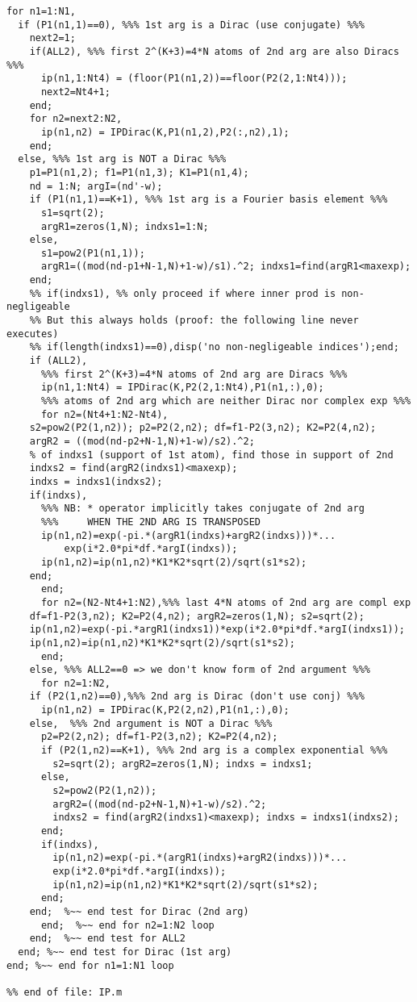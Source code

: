 \begin{verbatim}
for n1=1:N1,
  if (P1(n1,1)==0), %%% 1st arg is a Dirac (use conjugate) %%%
    next2=1;
    if(ALL2), %%% first 2^(K+3)=4*N atoms of 2nd arg are also Diracs %%%
      ip(n1,1:Nt4) = (floor(P1(n1,2))==floor(P2(2,1:Nt4)));
      next2=Nt4+1;
    end;
    for n2=next2:N2,
      ip(n1,n2) = IPDirac(K,P1(n1,2),P2(:,n2),1);
    end;
  else, %%% 1st arg is NOT a Dirac %%%
    p1=P1(n1,2); f1=P1(n1,3); K1=P1(n1,4);
    nd = 1:N; argI=(nd'-w);
    if (P1(n1,1)==K+1), %%% 1st arg is a Fourier basis element %%%
      s1=sqrt(2); 
      argR1=zeros(1,N); indxs1=1:N;
    else,
      s1=pow2(P1(n1,1)); 
      argR1=((mod(nd-p1+N-1,N)+1-w)/s1).^2; indxs1=find(argR1<maxexp);
    end;
    %% if(indxs1), %% only proceed if where inner prod is non-negligeable
    %% But this always holds (proof: the following line never executes)
    %% if(length(indxs1)==0),disp('no non-negligeable indices');end;
    if (ALL2), 
      %%% first 2^(K+3)=4*N atoms of 2nd arg are Diracs %%%
      ip(n1,1:Nt4) = IPDirac(K,P2(2,1:Nt4),P1(n1,:),0);
      %%% atoms of 2nd arg which are neither Dirac nor complex exp %%%
      for n2=(Nt4+1:N2-Nt4),
	s2=pow2(P2(1,n2)); p2=P2(2,n2); df=f1-P2(3,n2); K2=P2(4,n2);
	argR2 = ((mod(nd-p2+N-1,N)+1-w)/s2).^2;
	% of indxs1 (support of 1st atom), find those in support of 2nd
	indxs2 = find(argR2(indxs1)<maxexp);
	indxs = indxs1(indxs2);
	if(indxs),
	  %%% NB: * operator implicitly takes conjugate of 2nd arg
	  %%%     WHEN THE 2ND ARG IS TRANSPOSED
	  ip(n1,n2)=exp(-pi.*(argR1(indxs)+argR2(indxs)))*...
	      exp(i*2.0*pi*df.*argI(indxs));
	  ip(n1,n2)=ip(n1,n2)*K1*K2*sqrt(2)/sqrt(s1*s2);
	end;
      end;
      for n2=(N2-Nt4+1:N2),%%% last 4*N atoms of 2nd arg are compl exp
	df=f1-P2(3,n2); K2=P2(4,n2); argR2=zeros(1,N); s2=sqrt(2);
	ip(n1,n2)=exp(-pi.*argR1(indxs1))*exp(i*2.0*pi*df.*argI(indxs1));
	ip(n1,n2)=ip(n1,n2)*K1*K2*sqrt(2)/sqrt(s1*s2);
      end;
    else, %%% ALL2==0 => we don't know form of 2nd argument %%%
      for n2=1:N2,
	if (P2(1,n2)==0),%%% 2nd arg is Dirac (don't use conj) %%%
	  ip(n1,n2) = IPDirac(K,P2(2,n2),P1(n1,:),0);
	else,  %%% 2nd argument is NOT a Dirac %%%
	  p2=P2(2,n2); df=f1-P2(3,n2); K2=P2(4,n2);
	  if (P2(1,n2)==K+1), %%% 2nd arg is a complex exponential %%%
	    s2=sqrt(2); argR2=zeros(1,N); indxs = indxs1;
	  else,
	    s2=pow2(P2(1,n2)); 
	    argR2=((mod(nd-p2+N-1,N)+1-w)/s2).^2;
	    indxs2 = find(argR2(indxs1)<maxexp); indxs = indxs1(indxs2);
	  end;
	  if(indxs),
	    ip(n1,n2)=exp(-pi.*(argR1(indxs)+argR2(indxs)))*...
		exp(i*2.0*pi*df.*argI(indxs));
	    ip(n1,n2)=ip(n1,n2)*K1*K2*sqrt(2)/sqrt(s1*s2);
	  end;
	end;  %~~ end test for Dirac (2nd arg)
      end;  %~~ end for n2=1:N2 loop
    end;  %~~ end test for ALL2 
  end; %~~ end test for Dirac (1st arg)
end; %~~ end for n1=1:N1 loop

%% end of file: IP.m
\end{verbatim}   

